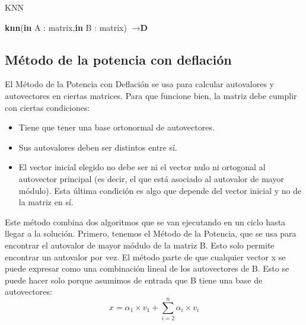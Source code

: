 \begin{algorithm}
\caption{KNN}\label{knn_algo}
\begin{algorithmic}
\State \textbf{knn}(\textbf{in} A : matrix,\textbf{in} B : matrix) $\to \textbf{D}$
 


    

\end{algorithmic}
\end{algorithm}

\subsection{Método de la potencia con deflación}
\label{met_pot}

El Método de la Potencia con Deflación se usa para calcular autovalores y autovectores en ciertas matrices. Para que funcione bien, la matriz debe cumplir con ciertas condiciones:

\begin{itemize} 
    \item Tiene que tener una base ortonormal de autovectores. 
    \item Sus autovalores deben ser distintos entre sí. 
    \item El vector inicial elegido no debe ser ni el vector nulo ni ortogonal al autovector principal (es decir, el que está asociado al autovalor de mayor módulo). Esta última condición es algo que depende del vector inicial y no de la matriz en sí.
\end{itemize}

Este método combina dos algoritmos que se van ejecutando en un ciclo hasta llegar a la solución. Primero, tenemos el Método de la Potencia, que se usa para encontrar el autovalor de mayor módulo de la matriz B. Esto solo permite encontrar un autovalor por vez. El método parte de que cualquier vector x se puede expresar como una combinación lineal de los autovectores de B. Esto se puede hacer solo porque asumimos de entrada que B tiene una base de autovectores:
\[ 
    x = \alpha_{1} \times v_{1} + \sum_{i=2}^{n} \alpha_{i} \times v_{i} 
\]


